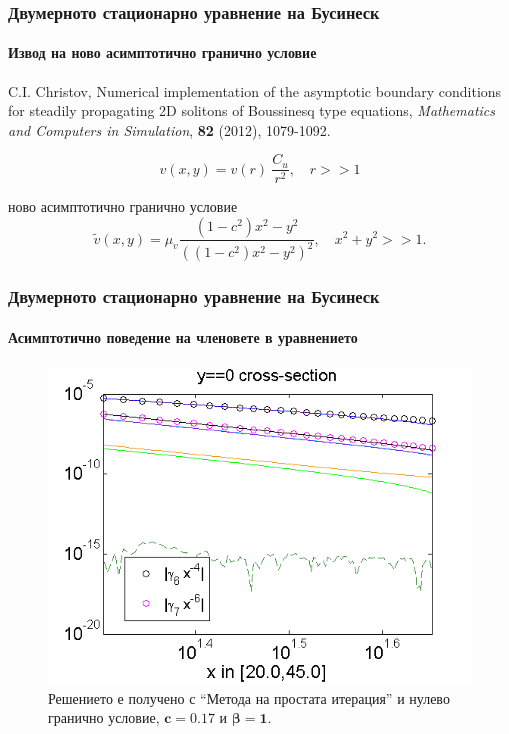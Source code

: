 \documentclass{beamer}
\begin{document}
\begin{frame}
\frametitle{Двумерното стационарно уравнение на Бусинеск}
\framesubtitle{Извод на ново асимптотично гранично условие}

\begin{itemize}
 {\footnotesize \item  C.I. Christov,
Numerical implementation of the asymptotic boundary conditions for steadily propagating 2D solitons of Boussinesq type equations,
{\it Mathematics and Computers in Simulation}, \textbf{82} (2012), 1079-1092.}
\begin{equation}
v(x,y) = v(r) ~ \frac{C_u}{r^2}, \quad r>>1
\end{equation}
  \item ново асимптотично гранично условие
\begin{equation}\label{bndK}
\tilde v(x,y) = \mu_v \frac{ (1-c^2)x^2 - y^2}{ ((1-c^2)x^2 - y^2)^2}, \quad x^2 + y^2 >> 1.
\end{equation}
\end{itemize}
 

\end{frame}

\begin{frame}
\frametitle{Двумерното стационарно уравнение на Бусинеск}
\framesubtitle{Асимптотично поведение на членовете в уравнението}
\begin{figure}
	\includegraphics[width=0.8\linewidth]{../Thesis/AssymptForEachTerm/c017_bt1_5/ChristovIC_AlongX_50_ZB2_bt1_c017_h020_O(h^6).png}
	\caption{Решението е получено с ``Метода на простата итерация'' и нулево гранично условие, $\boldsymbol{c=0.17}$ и $\boldsymbol{\beta = 1}$. }
	\label{fig:assympt_c017bt11}
\end{figure}

\end{frame}
\end{document}
